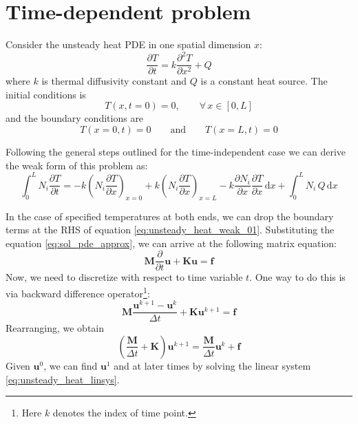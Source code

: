 \documentclass[a4paper,12pt]{article} %
\begin{document}
\section{Time-dependent problem}

Consider the unsteady heat PDE in one spatial dimension $x$:
\begin{equation}
\frac{\partial T}{\partial t} = k \frac{\partial^2 T}{\partial x^2} + Q
\end{equation}
where $k$ is thermal diffusivity constant and $Q$ is a constant heat source.
%
The initial conditions is
\begin{equation}
T(x,t=0) = 0,\qquad \forall \, x \in [0,L]
\end{equation}
and the boundary conditions are
\begin{equation}
T(x=0,t) = 0 \qquad \text{and} \qquad T(x=L,t) = 0
\end{equation}

Following the general steps outlined for the time-independent case we can
derive the weak form of this problem as:
\begin{equation}
\int_{0}^{L} N_{i} \frac{\partial T}{\partial t} =
-k \left(N_{i} \frac{\partial T}{\partial x} \right)_{x=0}
+k \left(N_{i} \frac{\partial T}{\partial x} \right)_{x=L}
-k \frac{\partial N_{i}}{\partial x} \frac{\partial T}{\partial x}\,\mathrm{d}x +
\int_{0}^{L} N_{i}\,Q\,\mathrm{d}x
\label{eq:unsteady_heat_weak_01}
\end{equation}

In the case of specified temperatures at both ends, we can drop the boundary terms
at the RHS of equation \eqref{eq:unsteady_heat_weak_01}. Substituting the equation
\eqref{eq:sol_pde_approx}, we can arrive at the following matrix equation:
\begin{equation}
\mathbf{M} \frac{\partial}{\partial t}\mathbf{u} + \mathbf{K}\mathbf{u} =
\mathbf{f}
\end{equation}
Now, we need to discretize with respect to time variable $t$. One way to do this
is via backward difference operator\footnote{Here $k$ denotes the index of time
point.}:
\begin{equation}
\mathbf{M} \frac{\mathbf{u}^{k+1} - \mathbf{u}^{k}}{\Delta t} +
\mathbf{K}\mathbf{u}^{k+1} = \mathbf{f}
\end{equation}
Rearranging, we obtain
\begin{equation}
\left( \frac{\mathbf{M}}{\Delta t} + \mathbf{K} \right) \mathbf{u}^{k+1} =
\frac{\mathbf{M}}{\Delta t} \mathbf{u}^{k} + \mathbf{f}
\label{eq:unsteady_heat_linsys}
\end{equation}
Given $\mathbf{u}^{0}$, we can find $\mathbf{u}^{1}$ and at later times
by solving the linear system \eqref{eq:unsteady_heat_linsys}.






\end{document}

